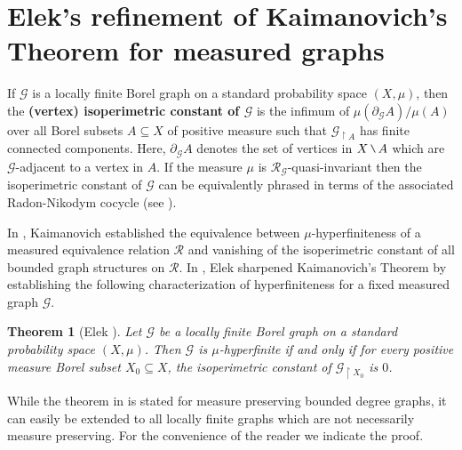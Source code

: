 \documentclass[11pt]{amsart}
\theoremstyle{definition}
\theoremstyle{plain}
\newtheorem{thm}[definition]{Theorem}
\newcommand{\<}{\langle}
\renewcommand{\>}{\rangle}
\newcommand{\boundary}{\partial}
\newcommand{\Ggraph}{\mathcal{G}}
\newcommand{\define}[1]{\textbf{#1}}
\newcommand\RR{\mathscr{R}}
\newcommand{\mysetminusD}{\hbox{\tikz{\draw[line width=0.6pt,line cap=round] (3pt,0) -- (0,6pt);}}}
\newcommand{\mysetminusT}{\mysetminusD}
\newcommand{\mysetminusS}{\hbox{\tikz{\draw[line width=0.45pt,line cap=round] (2pt,0) -- (0,4pt);}}}
\newcommand{\mysetminusSS}{\hbox{\tikz{\draw[line width=0.4pt,line cap=round] (1.5pt,0) -- (0,3pt);}}}
\newcommand{\mysetminus}{\mathbin{\mathchoice{\mysetminusD}{\mysetminusT}{\mysetminusS}{\mysetminusSS}}}%
\begin{document}
\section{Elek's refinement of Kaimanovich's Theorem for measured graphs}
If ${\Ggraph}$ is a locally finite Borel graph on a standard
probability space $(X,\mu)$, then the \define{(vertex) isoperimetric
constant of ${\Ggraph}$} is the
infimum of $\mu(\boundary _{\Ggraph} A) / \mu(A)$ over all Borel subsets $A \subseteq X$ of
positive measure such that ${\Ggraph}_{\restriction A}$ has finite
connected components. Here, $\boundary _{\Ggraph} A$ denotes the set of vertices in $X\mysetminus A$ which are ${\Ggraph}$-adjacent to a vertex in $A$.  If the measure $\mu$ is $\RR_{\Ggraph}$-quasi-invariant then the isoperimetric constant of ${\Ggraph}$ can be equivalently phrased in terms of the associated Radon-Nikodym cocycle (see \cite[\S 8]{KM04}).

In \cite{Kai97}, Kaimanovich established the equivalence between $\mu$-hyperfiniteness of a measured equivalence relation $\RR$ and vanishing of the isoperimetric constant of all bounded graph structures on $\RR$. In \cite{El12}, Elek sharpened Kaimanovich's Theorem by establishing the following characterization of hyperfiniteness for a fixed measured graph ${\Ggraph}$.

\begin{thm}[Elek \cite{El12}]\label{thm:Elek}
  Let ${\Ggraph}$ be a locally finite Borel graph on a standard probability
  space $(X,\mu)$. Then ${\Ggraph}$ is $\mu$-hyperfinite if and only if for every positive measure Borel subset $X_0\subseteq X$, the isoperimetric constant of ${\Ggraph}_{\restriction X_0}$ is $0$.
\end{thm}

While the theorem in \cite{El12} is stated for measure preserving bounded degree graphs, it can easily be extended to all locally finite graphs which are not necessarily measure preserving. For the convenience of the reader we indicate the proof.
\end{document}
